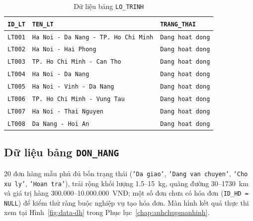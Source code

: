 \documentclass[11pt]{report}
\begin{document}
\begin{table}[H]
    \centering
    \renewcommand{\tabularxcolumn}[1]{m{#1}}
    \begin{tabularx}{\textwidth}{|l|l|>{\raggedright\arraybackslash}X|} \hline
        \rowcolor{teal!30}
        \textbf{\texttt{ID\_LT}} & \textbf{\texttt{TEN\_LT}} & \textbf{\texttt{TRANG\_THAI}} \\ \hline
        \texttt{LT001} & \texttt{Ha Noi - Da Nang - TP. Ho Chi Minh} & \texttt{Dang hoat dong} \\ \hline
        \texttt{LT002} & \texttt{Ha Noi - Hai Phong}                 & \texttt{Dang hoat dong} \\ \hline
        \texttt{LT003} & \texttt{TP. Ho Chi Minh - Can Tho}          & \texttt{Dang hoat dong} \\ \hline
        \texttt{LT004} & \texttt{Ha Noi - Da Nang}                   & \texttt{Dang hoat dong} \\ \hline
        \texttt{LT005} & \texttt{Ha Noi - Vinh - Da Nang}            & \texttt{Dang hoat dong} \\ \hline
        \texttt{LT006} & \texttt{TP. Ho Chi Minh - Vung Tau}         & \texttt{Dang hoat dong} \\ \hline
        \texttt{LT007} & \texttt{Ha Noi - Thai Nguyen}               & \texttt{Dang hoat dong} \\ \hline
        \texttt{LT008} & \texttt{Da Nang - Hoi An}                   & \texttt{Dang hoat dong} \\ \hline
    \end{tabularx}
    \caption{Dữ liệu bảng \texttt{LO\_TRINH}}
    \label{tab:data_lt}
\end{table}


\subsection{Dữ liệu bảng \texttt{DON\_HANG}}

20 đơn hàng mẫu phủ đủ bốn trạng thái (\texttt{'Da giao'}, \texttt{'Dang van chuyen'}, \texttt{'Cho xu ly'}, \texttt{'Hoan tra'}), trải rộng khối lượng 1.5--15~kg, quãng đường 30--1730~km và giá trị hàng 300.000--10.000.000~VNĐ; một số đơn chưa có hóa đơn (\texttt{ID\_HD = NULL}) để kiểm thử ràng buộc nghiệp vụ tạo hóa đơn. Màn hình kết quả thực thi xem tại Hình~\ref{fig:data-dh} trong Phục lục~\ref{chap:anhchupmanhinh}.
\end{document}
